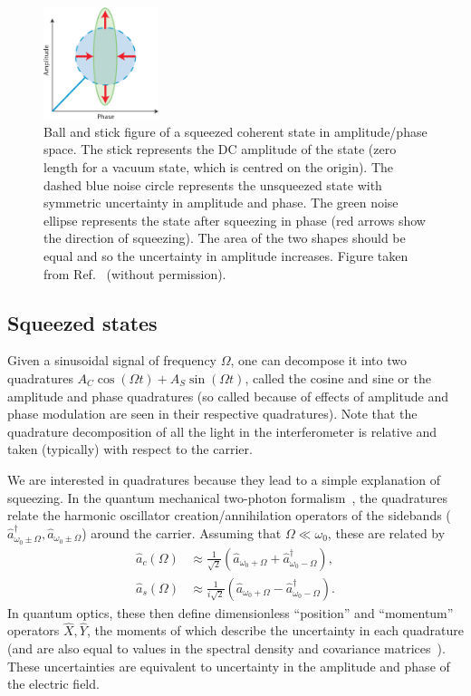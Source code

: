 \documentclass[aps,pra,superscriptaddress,reprint,nofootinbib]{revtex4-1}
\begin{document}
\begin{figure}[ht]%
	\begin{center}
	\includegraphics[width=0.3\textwidth]{figures/ball_and_stick_squeezed_state.png}
	\end{center}
	\caption{Ball and stick figure of a squeezed coherent state in amplitude/phase space. The stick represents the DC amplitude of the state (zero length for a vacuum state, which is centred on the origin). The dashed blue noise circle represents the unsqueezed state with symmetric uncertainty in amplitude and phase. The green noise ellipse represents the state after squeezing in phase (red arrows show the direction of squeezing). The area of the two shapes should be equal and so the uncertainty in amplitude increases. Figure taken from Ref.~\cite{Sparkes2013StorageAM} (without permission).}
	\label{fig:ball_and_stick_squeezed_state}
\end{figure}

\subsection{Squeezed states}

Given a sinusoidal signal of frequency $\Omega$, one can decompose it into two quadratures $A_C \cos(\Omega t) + A_S \sin(\Omega t)$, called the cosine and sine or the amplitude and phase quadratures (so called because of effects of amplitude and phase modulation are seen in their respective quadratures). Note that the quadrature decomposition of all the light in the interferometer is relative and taken (typically) with respect to the carrier.


We are interested in quadratures because they lead to a simple explanation of squeezing. In the quantum mechanical two-photon formalism~\cite{Danilishin_2012}, the quadratures relate the harmonic oscillator creation/annihilation operators of the sidebands ($\hat{a}_{\omega_0 \pm \Omega}^\dagger, \hat{a}_{\omega_0 \pm \Omega}$) around the carrier. Assuming that $\Omega \ll \omega_0$, these are related by
\begin{align}
\hat{a}_c(\Omega) &\approx \frac{1}{\sqrt{2}} (\hat{a}_{\omega_0 + \Omega} + \hat{a}_{\omega_0 - \Omega}^\dagger),\\
\hat{a}_s(\Omega) &\approx \frac{1}{i \sqrt{2}} (\hat{a}_{\omega_0 + \Omega} - \hat{a}_{\omega_0 - \Omega}^\dagger).
\end{align}
In quantum optics, these then define dimensionless “position” and “momentum” operators $\hat{X}, \hat{Y}$, the moments of which describe the uncertainty in each quadrature (and are also equal to values in the spectral density and covariance matrices~\cite{Danilishin_2012}). These uncertainties are equivalent to uncertainty in the amplitude and phase of the electric field.
\end{document}
